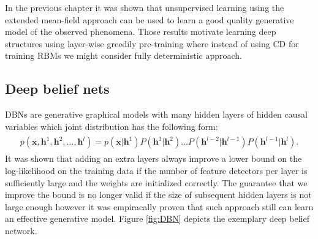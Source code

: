 In the previous chapter it was shown that unsupervised learning using the extended mean-field approach can be used to learn a good quality generative model of the observed phenomena. Those results motivate learning deep structures using layer-wise greedily pre-training where instead of using CD for training RBMs we might consider fully deterministic approach. 
\subsection{Deep belief nets}
DBNs are generative graphical models with many hidden layers of hidden
causal variables which joint distribution has the following form:
\begin{align}
\begin{split}
p(\mathbf{x}, \mathbf{h}^1, \mathbf{h}^2,..., \mathbf{h}^l) = p(\mathbf{x}| \mathbf{h}^1)P(\mathbf{h}^1|\mathbf{h}^2)...
P(\mathbf{h}^{l-2}|\mathbf{h}^{l-1})P(\mathbf{h}^{l-1}|\mathbf{h}^{l}).
\end{split}
\end{align}
It was shown that adding an extra layers always improve a lower bound on the log-likelihood on the training data if the number of feature detectors per layer is sufficiently large and the weights are initialized correctly.  The guarantee that we improve the bound is no longer valid if the size of subsequent hidden layers is not large enough however it was empiracally proven that such approach still can learn an effective generative model. Figure \ref{fig:DBN} depicts the exemplary deep belief network. 

